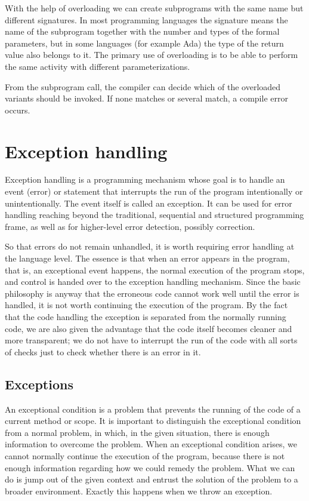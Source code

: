 \documentclass[margin=0px]{article}
\begin{document}
With the help of overloading we can create subprograms with the same name but different signatures. In most programming languages the signature means the name of the subprogram together with the number and types of the formal parameters, but in some languages (for example Ada) the type of the return value also belongs to it. The primary use of overloading is to be able to perform the same activity with different parameterizations.

From the subprogram call, the compiler can decide which of the overloaded variants should be invoked. If none matches or several match, a compile error occurs.

\section{Exception handling}
Exception handling is a programming mechanism whose goal is to handle an event (error) or statement that interrupts the run of the program intentionally or unintentionally. The event itself is called an exception. It can be used for error handling reaching beyond the traditional, sequential and structured programming frame, as well as for higher-level error detection, possibly correction.

So that errors do not remain unhandled, it is worth requiring error handling at the language level. The essence is that when an error appears in the program, that is, an exceptional event happens, the normal execution of the program stops, and control is handed over to the exception handling mechanism. Since the basic philosophy is anyway that the erroneous code cannot work well until the error is handled, it is not worth continuing the execution of the program. By the fact that the code handling the exception is separated from the normally running code, we are also given the advantage that the code itself becomes cleaner and more transparent; we do not have to interrupt the run of the code with all sorts of checks just to check whether there is an error in it.

\subsection{Exceptions}
An exceptional condition is a problem that prevents the running of the code of a current method or scope. It is important to distinguish the exceptional condition from a normal problem, in which, in the given situation, there is enough information to overcome the problem. When an exceptional condition arises, we cannot normally continue the execution of the program, because there is not enough information regarding how we could remedy the problem. What we can do is jump out of the given context and entrust the solution of the problem to a broader environment. Exactly this happens when we throw an exception.
\end{document}
